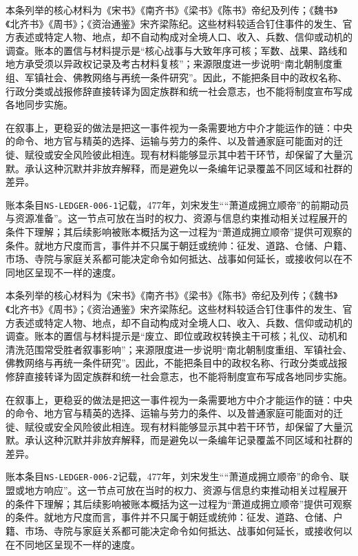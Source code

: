 本条列举的核心材料为《宋书》《南齐书》《梁书》《陈书》帝纪及列传；《魏书》《北齐书》《周书》；《资治通鉴》宋齐梁陈纪。这些材料较适合钉住事件的发生、官方表述或特定人物、地点，却不自动构成对全境人口、收入、兵数、信仰或动机的调查。账本的置信与材料提示是“核心战事与大致年序可核；军数、战果、路线和地方承受须以异政权记录及考古材料复核”；来源限度进一步说明“南北朝制度重组、军镇社会、佛教网络与再统一条件研究”。因此，不能把条目中的政权名称、行政分类或战报修辞直接转译为固定族群和统一社会意志，也不能将制度宣布写成各地同步实施。

在叙事上，更稳妥的做法是把这一事件视为一条需要地方中介才能运作的链：中央的命令、地方官与精英的选择、运输与劳力的条件、以及普通家庭可能面对的迁徙、赋役或安全风险彼此相连。现有材料能够显示其中若干环节，却保留了大量沉默。承认这种沉默并非放弃解释，而是避免以一条编年记录覆盖不同区域和社群的差异。

账本条目\texttt{NS-LEDGER-006-1}记载，477年，刘宋发生““萧道成拥立顺帝”的前期动员与资源准备”。这一节点可放在当时的权力、资源与信息约束推动相关过程展开的条件下理解；其后续影响被账本概括为这一过程为“萧道成拥立顺帝”提供可观察的条件。就地方尺度而言，事件并不只属于朝廷或统帅：征发、道路、仓储、户籍、市场、寺院与家庭关系都可能决定命令如何抵达、战事如何延长，或接收何以在不同地区呈现不一样的速度。

本条列举的核心材料为《宋书》《南齐书》《梁书》《陈书》帝纪及列传；《魏书》《北齐书》《周书》；《资治通鉴》宋齐梁陈纪。这些材料较适合钉住事件的发生、官方表述或特定人物、地点，却不自动构成对全境人口、收入、兵数、信仰或动机的调查。账本的置信与材料提示是“废立、即位或政权转换主干可核；礼仪、动机和清洗范围常受胜者叙事影响”；来源限度进一步说明“南北朝制度重组、军镇社会、佛教网络与再统一条件研究”。因此，不能把条目中的政权名称、行政分类或战报修辞直接转译为固定族群和统一社会意志，也不能将制度宣布写成各地同步实施。

在叙事上，更稳妥的做法是把这一事件视为一条需要地方中介才能运作的链：中央的命令、地方官与精英的选择、运输与劳力的条件、以及普通家庭可能面对的迁徙、赋役或安全风险彼此相连。现有材料能够显示其中若干环节，却保留了大量沉默。承认这种沉默并非放弃解释，而是避免以一条编年记录覆盖不同区域和社群的差异。

账本条目\texttt{NS-LEDGER-006-2}记载，477年，刘宋发生““萧道成拥立顺帝”的命令、联盟或地方响应”。这一节点可放在当时的权力、资源与信息约束推动相关过程展开的条件下理解；其后续影响被账本概括为这一过程为“萧道成拥立顺帝”提供可观察的条件。就地方尺度而言，事件并不只属于朝廷或统帅：征发、道路、仓储、户籍、市场、寺院与家庭关系都可能决定命令如何抵达、战事如何延长，或接收何以在不同地区呈现不一样的速度。

